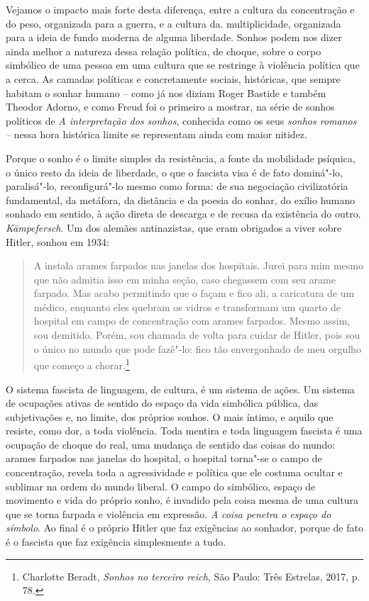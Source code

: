 Vejamos o impacto mais forte desta diferença, entre a cultura da
concentração e do peso, organizada para a guerra, e a cultura da.
multiplicidade, organizada para a ideia de fundo moderna de alguma
liberdade. Sonhos podem nos dizer ainda melhor a natureza dessa relação
política, de choque, sobre o corpo simbólico de uma pessoa em uma
cultura que se restringe à violência política que a cerca. As camadas
políticas e concretamente sociais, históricas, que sempre habitam o
sonhar humano -- como já nos diziam Roger Bastide e também Theodor
Adorno, e como Freud foi o primeiro a mostrar, na série de sonhos
políticos de \emph{A interpretação dos sonhos}, conhecida como os seus
\emph{sonhos romanos --} nessa hora histórica limite se representam
ainda com maior nitidez.

Porque o sonho é o limite simples da resistência, a fonte da mobilidade
psíquica, o único resto da ideia de liberdade, o que o fascista visa é
de fato dominá"-lo, paralisá"-lo, reconfigurá"-lo mesmo como forma: de sua
negociação civilizatória fundamental, da metáfora, da distância e da
poesia do sonhar, do exílio humano sonhado em sentido, à ação direta de
descarga e de recusa da existência do outro. \emph{Kämpefersch}. Um dos
alemães antinazistas, que eram obrigados a viver sobre Hitler, sonhou em
1934:

\begin{quote}
A  instala arames farpados nas janelas dos hospitais. Jurei para mim
mesmo que não admitia isso em minha seção, caso chegassem com seu arame
farpado. Mas acabo permitindo que o façam e fico ali, a caricatura de um
médico, enquanto eles quebram os vidros e transformam um quarto de
hospital em campo de concentração com arames farpados. Mesmo assim, sou
demitido. Porém, sou chamada de volta para cuidar de Hitler, pois sou o
único no mundo que pode fazê"-lo: fico tão envergonhado de meu orgulho
que começo a chorar.\footnote{Charlotte Beradt, \emph{Sonhos no
  terceiro reich}, São Paulo: Três Estrelas, 2017, p. 78.}
  \end{quote}

O sistema fascista de linguagem, de cultura, é um sistema de ações. Um
sistema de ocupações ativas de sentido do espaço da vida simbólica
pública, das subjetivações e, no limite, dos próprios sonhos. O mais
íntimo, e aquilo que resiste, como dor, a toda violência. Toda mentira e
toda linguagem fascista é uma ocupação de choque do real, uma mudança de
sentido das coisas do mundo: arames farpados nas janelas do hospital, o
hospital torna"-se o campo de concentração, revela toda a agressividade e
política que ele costuma ocultar e sublimar na ordem do mundo liberal. O
campo do simbólico, espaço de movimento e vida do próprio sonho, é
invadido pela coisa mesma de uma cultura que se torna farpada e
violência em expressão. \emph{A} \emph{coisa penetra o espaço do
símbolo}. Ao final é o próprio Hitler que faz exigências ao sonhador,
porque de fato é o fascista que faz exigência simplesmente a tudo.

